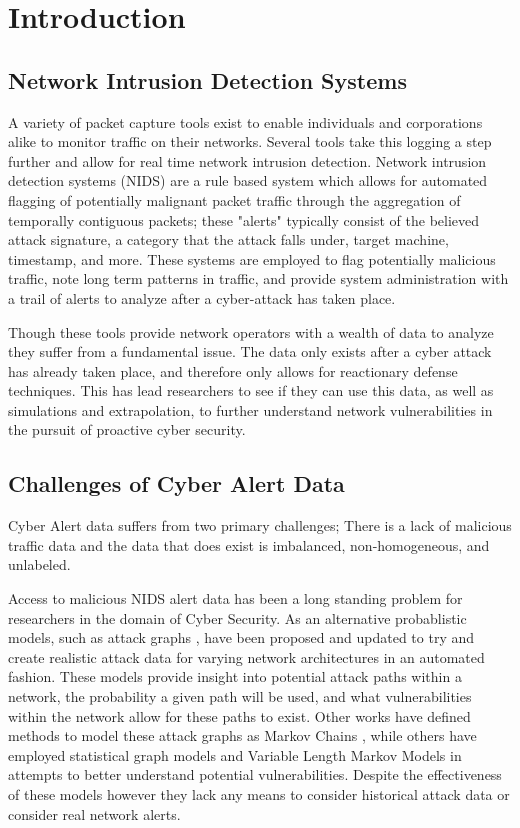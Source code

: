 \chapter{Introduction}

\section{Network Intrusion Detection Systems}
A variety of packet capture tools exist to enable individuals and corporations alike to monitor traffic on their networks. Several tools take this logging a step further and allow for real time network intrusion detection. Network intrusion detection systems (NIDS) are a rule based system which allows for automated flagging of potentially malignant packet traffic through the aggregation of temporally contiguous packets;  these "alerts" typically consist of the believed attack signature, a category that the attack falls under, target machine, timestamp, and more. These systems are employed to flag potentially malicious traffic, note long term patterns in traffic, and provide system administration with a trail of alerts to analyze after a cyber-attack has taken place. 

Though these tools provide network operators with a wealth of data to analyze they suffer from a fundamental issue. The data only exists after a cyber attack has already taken place, and therefore only allows for reactionary defense techniques. This has lead researchers to see if they can use this data, as well as simulations and extrapolation, to further understand network vulnerabilities in the pursuit of proactive cyber security. 

\section{Challenges of Cyber Alert Data}
Cyber Alert data suffers from two primary challenges; There is a lack of malicious traffic data and the data that does exist is imbalanced, non-homogeneous, and unlabeled. 

Access to malicious NIDS alert data has been a long standing problem for researchers in the domain of Cyber Security. As an alternative probablistic models, such as attack graphs \cite{Qin2004, Wang2006, Noel2009}, have been proposed and updated to try and create realistic attack data for varying network architectures in an automated fashion. These models provide insight into potential attack paths within a network, the probability a given path will be used, and what vulnerabilities within the network allow for these paths to exist. Other works have defined methods to model these attack graphs as Markov Chains \cite{Li2017}, while others have employed statistical graph models \cite{Du2014} and Variable Length Markov Models \cite{Fava2008} in attempts to better understand potential vulnerabilities. Despite the effectiveness of these models however they lack any means to consider historical attack data or consider real network alerts. 

